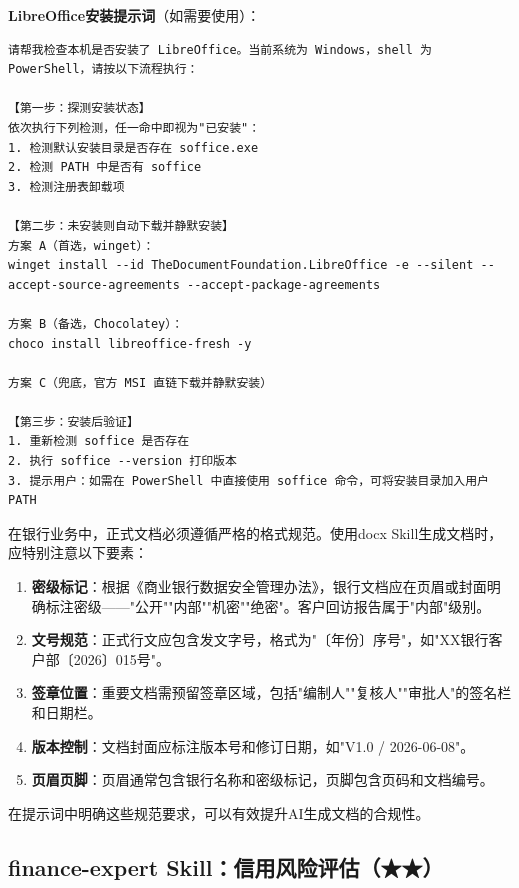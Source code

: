 \textbf{LibreOffice安装提示词}（如需要使用）：

\begin{lstlisting}
请帮我检查本机是否安装了 LibreOffice。当前系统为 Windows，shell 为 PowerShell，请按以下流程执行：

【第一步：探测安装状态】
依次执行下列检测，任一命中即视为"已安装"：
1. 检测默认安装目录是否存在 soffice.exe
2. 检测 PATH 中是否有 soffice
3. 检测注册表卸载项

【第二步：未安装则自动下载并静默安装】
方案 A（首选，winget）：
winget install --id TheDocumentFoundation.LibreOffice -e --silent --accept-source-agreements --accept-package-agreements

方案 B（备选，Chocolatey）：
choco install libreoffice-fresh -y

方案 C（兜底，官方 MSI 直链下载并静默安装）

【第三步：安装后验证】
1. 重新检测 soffice 是否存在
2. 执行 soffice --version 打印版本
3. 提示用户：如需在 PowerShell 中直接使用 soffice 命令，可将安装目录加入用户 PATH
\end{lstlisting}

\begin{theorybox}[银行文档规范要求]
在银行业务中，正式文档必须遵循严格的格式规范。使用docx Skill生成文档时，应特别注意以下要素：

\begin{enumerate}[leftmargin=1em]
  \item \textbf{密级标记}：根据《商业银行数据安全管理办法》，银行文档应在页眉或封面明确标注密级——"公开""内部""机密""绝密"。客户回访报告属于"内部"级别。
  \item \textbf{文号规范}：正式行文应包含发文字号，格式为"〔年份〕序号"，如"XX银行客户部〔2026〕015号"。
  \item \textbf{签章位置}：重要文档需预留签章区域，包括"编制人""复核人""审批人"的签名栏和日期栏。
  \item \textbf{版本控制}：文档封面应标注版本号和修订日期，如"V1.0 / 2026-06-08"。
  \item \textbf{页眉页脚}：页眉通常包含银行名称和密级标记，页脚包含页码和文档编号。
\end{enumerate}

在提示词中明确这些规范要求，可以有效提升AI生成文档的合规性。
\end{theorybox}

\subsection{finance-expert Skill：信用风险评估（★★）}

